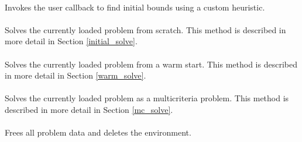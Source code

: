 \paragraph{} Invokes the user callback to
find initial bounds using a custom heuristic.

\paragraph{} Solves the currently loaded problem from
scratch. This method is described in more detail in Section 
\ref{initial_solve}.

\paragraph{} Solves the currently loaded problem 
from a warm start. This method is described in more detail in 
Section \ref{warm_solve}.\\

\paragraph{} Solves the currently loaded problem as a
multicriteria problem. This method is described in more detail in Section 
\ref{mc_solve}.

\paragraph{} Frees all problem data and
deletes the environment. \\

